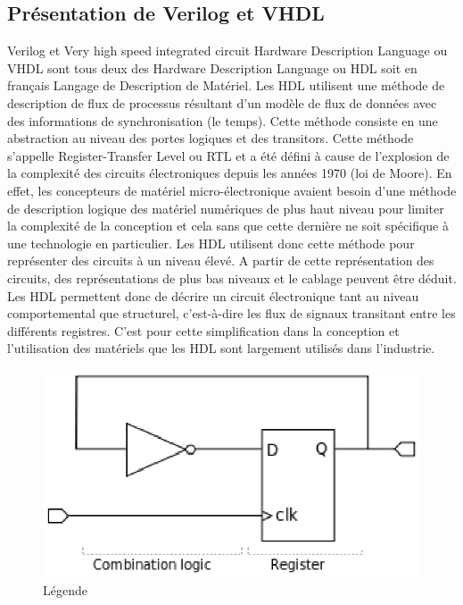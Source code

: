 \vspace{15px}
\subsection{Présentation de Verilog et VHDL}
\vspace{15px}
Verilog et Very high speed integrated circuit Hardware Description Language ou VHDL sont tous deux des Hardware Description Language ou HDL soit en français Langage de Description de Matériel. Les HDL utilisent une méthode de description de flux de processus résultant d'un modèle de flux de données avec des informations de synchronisation (le temps). Cette méthode consiste en une abstraction au niveau des portes logiques et des transitors. Cette méthode s'appelle Register-Transfer Level ou RTL et a été défini à cause de l'explosion de la complexité des circuits électroniques depuis les années 1970 (loi de Moore). En effet, les concepteurs de matériel micro-électronique avaient besoin d'une méthode de description logique des matériel numériques de plus haut niveau pour limiter la complexité de la conception et cela sans que cette dernière ne soit spécifique à une technologie en particulier. Les HDL utilisent donc cette méthode pour représenter des circuits à un niveau élevé. A partir de cette représentation des circuits, des représentations de plus bas niveaux et le cablage peuvent être déduit. Les HDL permettent donc de décrire un circuit électronique tant au niveau comportemental que structurel, c'est-à-dire les flux de signaux transitant entre les différents registres. C'est pour cette simplification dans la conception et l'utilisation des matériels que les HDL sont largement utilisés dans l'industrie.
\newpage

\begin{figure}
\begin{center}
\includegraphics[scale=0.4]{rtl_example.eps}
\end{center}
\caption{Légende}
\label{Référence}
\end{figure}

